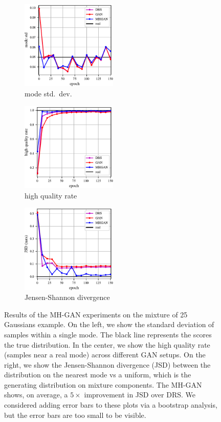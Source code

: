 \begin{figure}[htbp]
    \centering
    \begin{subfigure}[b]{0.32\textwidth}
       \centering
       \includegraphics[width=1.8in]{figures/std.pdf}
       \caption{mode std.~dev.}
       \label{fig:std}
    \end{subfigure}
    \begin{subfigure}[b]{0.32\textwidth}
       \centering
       \includegraphics[width=1.8in]{figures/hqr.pdf}
       \caption{high quality rate}
       \label{fig:hqr}
    \end{subfigure}
    \begin{subfigure}[b]{0.32\textwidth}
       \centering
       \includegraphics[width=1.8in]{figures/jsd.pdf}
       \caption{Jensen-Shannon divergence}
       \label{fig:jsd}
    \end{subfigure}
    \caption{{\small
    Results of the MH-GAN experiments on the mixture of 25 Gaussians example.
    On the left, we show the standard deviation of samples within a single mode.
    The black line represents the scores the true distribution.
    In the center, we show the high quality rate (samples near a real mode) across different GAN setups.
    On the right, we show the Jensen-Shannon divergence (JSD) between the distribution on the nearest mode vs a uniform, which is the generating distribution on mixture components.
    The MH-GAN shows, on average, a $5 \times$ improvement in JSD over DRS\@.
    We considered adding error bars to these plots via a bootstrap analysis, but the error bars are too small to be visible.
    }}
    \label{fig:mog_metrics}
\end{figure}

